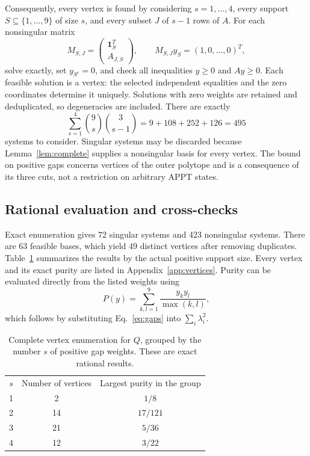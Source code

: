 \documentclass[aps,pra,onecolumn,notitlepage,10pt,amsmath,amssymb,longbibliography,nofootinbib]{revtex4-2}
\begin{document}
Consequently, every vertex is found by considering $s=1,\ldots,4$, every
support $S\subseteq\{1,\ldots,9\}$ of size $s$, and every subset $J$ of
$s-1$ rows of $A$. For each nonsingular matrix
\begin{equation}
 M_{S,J}=\begin{pmatrix}\boldsymbol{1}_S^T\\A_{J,S}\end{pmatrix},
 \qquad M_{S,J}y_S=(1,0,\ldots,0)^T,
 \label{eq:basis}
\end{equation}
solve exactly, set $y_{S^c}=0$, and check all inequalities $y\geq0$ and
$Ay\geq0$. Each feasible solution is a vertex: the selected independent
equalities and the zero coordinates determine it uniquely. Solutions with zero
weights are retained and deduplicated, so degeneracies are included.
There are exactly
\begin{equation}
 \sum_{s=1}^4 \binom{9}{s}\binom{3}{s-1}
       =9+108+252+126=495
 \label{eq:count}
\end{equation}
systems to consider. Singular systems may be discarded because
Lemma~\ref{lem:complete} supplies a nonsingular basis for every vertex.
The bound on positive gaps concerns vertices of the outer polytope and is a
consequence of its three cuts, not a restriction on arbitrary APPT states.

\subsection{Rational evaluation and cross-checks}

Exact enumeration gives 72 singular systems and 423 nonsingular systems.
There are 63 feasible bases, which yield 49 distinct vertices after removing
duplicates. Table~\ref{tab:groups} summarizes the results by the actual positive
support size. Every vertex and its exact purity are listed in
Appendix~\ref{app:vertices}. Purity can be evaluated directly from the listed
weights using
\begin{equation}
 P(y)=\sum_{k,l=1}^9\frac{y_ky_l}{\max(k,l)},
 \label{eq:Pgap}
\end{equation}
which follows by substituting Eq.~\eqref{eq:gaps} into $\sum_i\lambda_i^2$.

\begin{table}[htb]
\caption{Complete vertex enumeration for $Q$, grouped by the number $s$ of
positive gap weights. These are exact rational results.}
\label{tab:groups}
\begin{ruledtabular}
\begin{tabular}{ccc}
$s$ & Number of vertices & Largest purity in the group\\
1&2&$1/8$\\
2&14&$17/121$\\
3&21&$5/36$\\
4&12&$3/22$
\end{tabular}
\end{ruledtabular}
\end{table}
\end{document}
